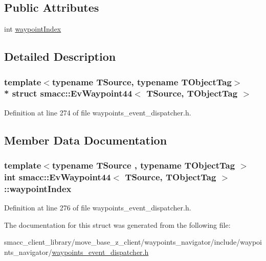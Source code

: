 \subsection*{Public Attributes}
\begin{DoxyCompactItemize}
\item 
int \hyperlink{structsmacc_1_1EvWaypoint44_ad04d553fb18326c1c2b9ddf7a5d57b7f}{waypoint\+Index}
\end{DoxyCompactItemize}


\subsection{Detailed Description}
\subsubsection*{template$<$typename T\+Source, typename T\+Object\+Tag$>$\\*
struct smacc\+::\+Ev\+Waypoint44$<$ T\+Source, T\+Object\+Tag $>$}



Definition at line 274 of file waypoints\+\_\+event\+\_\+dispatcher.\+h.



\subsection{Member Data Documentation}
\subsubsection[{\texorpdfstring{waypoint\+Index}{waypointIndex}}]{\setlength{\rightskip}{0pt plus 5cm}template$<$typename T\+Source , typename T\+Object\+Tag $>$ int {\bf smacc\+::\+Ev\+Waypoint44}$<$ T\+Source, T\+Object\+Tag $>$\+::waypoint\+Index}\hypertarget{structsmacc_1_1EvWaypoint44_ad04d553fb18326c1c2b9ddf7a5d57b7f}{}\label{structsmacc_1_1EvWaypoint44_ad04d553fb18326c1c2b9ddf7a5d57b7f}


Definition at line 276 of file waypoints\+\_\+event\+\_\+dispatcher.\+h.



The documentation for this struct was generated from the following file\+:\begin{DoxyCompactItemize}
\item 
smacc\+\_\+client\+\_\+library/move\+\_\+base\+\_\+z\+\_\+client/waypoints\+\_\+navigator/include/waypoints\+\_\+navigator/\hyperlink{waypoints__event__dispatcher_8h}{waypoints\+\_\+event\+\_\+dispatcher.\+h}\end{DoxyCompactItemize}
